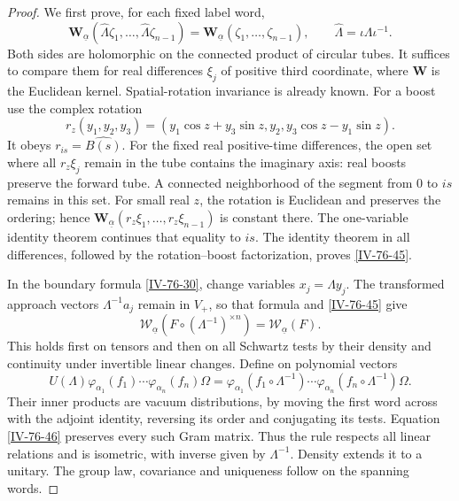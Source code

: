 \documentclass[11pt,letterpaper,reqno]{amsart}
\theoremstyle{definition}
\theoremstyle{remark}
\begin{document}
\begin{proof}
We first prove, for each fixed label word,
\begin{equation}\label{IV-76-45}
 \mathbf W_{\underline\alpha}(\widehat\Lambda\zeta_1,\ldots,
                   \widehat\Lambda\zeta_{n-1})
             =\mathbf W_{\underline\alpha}(\zeta_1,\ldots,\zeta_{n-1}),
 \qquad\widehat\Lambda=\iota\Lambda\iota^{-1}.
\end{equation}
Both sides are holomorphic on the connected product of
circular tubes. It suffices to compare them for real
differences $\xi_j$ of positive third coordinate, where
$\mathbf W$ is the Euclidean kernel. Spatial-rotation
invariance is already known. For a boost use the complex rotation
\begin{equation}\label{IV-76-49}
 r_z(y_1,y_2,y_3)=(y_1\cos z+y_3\sin z,y_2,
                                  y_3\cos z-y_1\sin z).
\end{equation}
It obeys $r_{is}=\widehat{B(s)}$. For the fixed real
positive-time differences, the open set where all
$r_z\xi_j$ remain in the tube contains the imaginary axis:
real boosts preserve the forward tube. A connected
neighborhood of the segment from $0$ to $is$ remains in
this set. For small real $z$, the rotation is Euclidean and
preserves the ordering; hence
$\mathbf W_{\underline\alpha}(r_z\xi_1,\ldots,r_z\xi_{n-1})$
is constant there. The one-variable identity theorem
continues that equality to $is$. The identity theorem in
all differences, followed by the rotation--boost factorization,
proves \eqref{IV-76-45}.

In the boundary formula \eqref{IV-76-30}, change variables
$x_j=\Lambda y_j$. The transformed approach vectors
$\Lambda^{-1}a_j$ remain in $V_+$, so that formula and
\eqref{IV-76-45} give
\begin{equation}\label{IV-76-46}
 \mathcal W_{\underline\alpha}
             (F\circ(\Lambda^{-1})^{\times n})
                         =\mathcal W_{\underline\alpha}(F).
\end{equation}
This holds first on tensors and then on all Schwartz tests
by their density and continuity under invertible linear changes.
Define on polynomial vectors
\[
 U(\Lambda)\varphi_{\alpha_1}(f_1)\cdots
                       \varphi_{\alpha_n}(f_n)\Omega
   =\varphi_{\alpha_1}(f_1\circ\Lambda^{-1})\cdots
                       \varphi_{\alpha_n}(f_n\circ\Lambda^{-1})\Omega.
\]
Their inner products are vacuum distributions, by moving
the first word across with the adjoint identity, reversing
its order and conjugating its tests. Equation
\eqref{IV-76-46} preserves every such Gram matrix.
Thus the rule respects all linear relations and is isometric,
with inverse given by $\Lambda^{-1}$. Density extends it
to a unitary. The group law, covariance and uniqueness
follow on the spanning words.


\end{proof}
\end{document}
